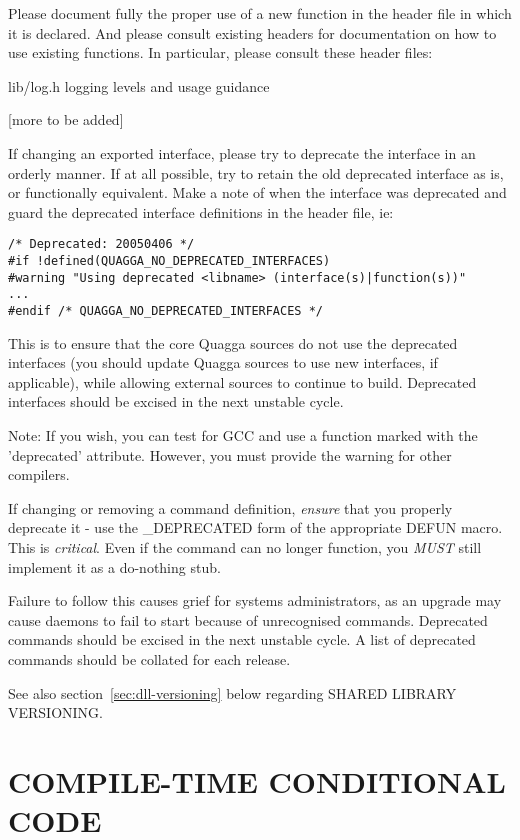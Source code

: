 \documentclass[oneside]{article}
\begin{document}
Please document fully the proper use of a new function in the header file
in which it is declared.  And please consult existing headers for
documentation on how to use existing functions.  In particular, please consult
these header files:

\begin{description}
  \item{lib/log.h}	logging levels and usage guidance
  \item{[more to be added]}
\end{description}

If changing an exported interface, please try to deprecate the interface in
an orderly manner. If at all possible, try to retain the old deprecated
interface as is, or functionally equivalent. Make a note of when the
interface was deprecated and guard the deprecated interface definitions in
the header file, ie:

\begin{verbatim}
/* Deprecated: 20050406 */
#if !defined(QUAGGA_NO_DEPRECATED_INTERFACES)
#warning "Using deprecated <libname> (interface(s)|function(s))"
...
#endif /* QUAGGA_NO_DEPRECATED_INTERFACES */
\end{verbatim}

This is to ensure that the core Quagga sources do not use the deprecated
interfaces (you should update Quagga sources to use new interfaces, if
applicable), while allowing external sources to continue to build. 
Deprecated interfaces should be excised in the next unstable cycle.

Note: If you wish, you can test for GCC and use a function
marked with the 'deprecated' attribute. However, you must provide the
warning for other compilers.

If changing or removing a command definition, \emph{ensure} that you
properly deprecate it - use the \_DEPRECATED form of the appropriate DEFUN
macro.  This is \emph{critical}.  Even if the command can no longer
function, you \emph{MUST} still implement it as a do-nothing stub. 

Failure to follow this causes grief for systems administrators, as an
upgrade may cause daemons to fail to start because of unrecognised commands. 
Deprecated commands should be excised in the next unstable cycle.  A list of
deprecated commands should be collated for each release.

See also section~\ref{sec:dll-versioning} below regarding SHARED LIBRARY
VERSIONING.


\section{COMPILE-TIME CONDITIONAL CODE}
\end{document}
